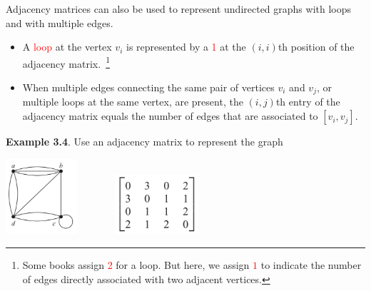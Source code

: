 \documentclass[aspectratio=169]{beamer}
\providecommand{\Red}[1]{\textcolor{red}{#1}}
\begin{document}
\begin{frame}[plain]{}

Adjacency matrices can also be used to represent undirected graphs with loops and with
multiple edges. 
\begin{itemize}
  \item A \Red{loop} at the vertex $v_i$ is represented by a \Red{1}
   at the $(i, i)$th position of the adjacency matrix.~\footnote{Some books assign 
   \Red{2} for a loop. But here, we assign \Red{$1$} to indicate the number of
   edges directly associated with two adjacent vertices. } 
\item When multiple edges connecting the same pair of vertices $v_i$ and $v_j$, or multiple
loops at the same vertex, are present, 
 the $(i, j)$th entry of the adjacency matrix equals the number of edges that are associated 
to $[v_i, v_j]$.
\end{itemize}

\medskip


 {\bf Example 3.4}. Use an adjacency matrix to represent the graph
 
 \begin{center}
  \includegraphics[height=2.8cm]{./img/lecture3-fig5a.png}\ \ \ \ \ \ \  \pause
  \includegraphics[height=2.2cm]{./img/lecture3-fig5b.png}
 \end{center}
 \medskip

 
\end{frame}
\end{document}
